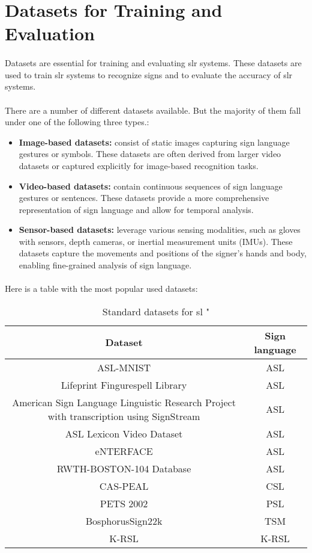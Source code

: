 \section{Datasets for Training and Evaluation}
\paragraph{}
Datasets are essential for training and evaluating \ac{slr} systems. These datasets are used to train \ac{slr} systems to recognize signs and to evaluate the accuracy of \ac{slr} systems.
\paragraph{}
There are a number of different datasets available. But the majority of them fall under one of the following three types.:
\begin{itemize}
	\item \textbf{Image-based datasets:} consist of static images capturing sign language gestures or symbols. These datasets are often derived from larger video datasets or captured explicitly for image-based recognition tasks.
	\item \textbf{Video-based datasets:} contain continuous sequences of sign language gestures or sentences. These datasets provide a more comprehensive representation of sign language and allow for temporal analysis.
	\item \textbf{Sensor-based datasets:} leverage various sensing modalities, such as gloves with sensors, depth cameras, or inertial measurement units (IMUs). These datasets capture the movements and positions of the signer's hands and body, enabling fine-grained analysis of sign language.
\end{itemize}
\paragraph{}
Here is a table with the most popular used datasets:
\begin{table}[h]
	\centering
	\caption{Standard datasets for \ac{sl} "\cite{5perc}}
	\begin{tabular}{|c|c|}
		\hline
		Dataset & Sign language\\
		\hline
		ASL-MNIST & ASL \\
		\hline
		Lifeprint Fingurespell Library & ASL \\
		\hline
		American Sign Language Linguistic Research Project with transcription using SignStream & ASL \\
		\hline
		ASL Lexicon Video Dataset & ASL \\
		\hline
		eNTERFACE & ASL \\
		\hline
		RWTH-BOSTON-104 Database & ASL \\
		\hline
		CAS-PEAL & CSL \\
		\hline
		PETS 2002 & PSL \\
		\hline
		BosphorusSign22k & TSM \\
		\hline
		K-RSL & K-RSL \\
		\hline
	\end{tabular}
\end{table}